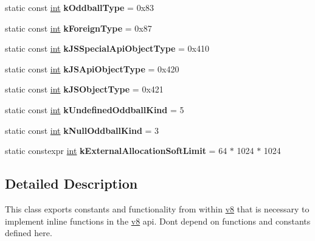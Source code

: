 \begin{DoxyCompactItemize}
static const \mbox{\hyperlink{classint}{int}} {\bfseries k\+Oddball\+Type} = 0x83
\item 
\mbox{\label{classv8_1_1internal_1_1Internals_a263195f36f9e8ee64af70dc267a85d55}} 
static const \mbox{\hyperlink{classint}{int}} {\bfseries k\+Foreign\+Type} = 0x87
\item 
\mbox{\label{classv8_1_1internal_1_1Internals_afa97943a189ab1866404416d2f8779bd}} 
static const \mbox{\hyperlink{classint}{int}} {\bfseries k\+J\+S\+Special\+Api\+Object\+Type} = 0x410
\item 
\mbox{\label{classv8_1_1internal_1_1Internals_aef1693d7df34df433622fdb3e26767c8}} 
static const \mbox{\hyperlink{classint}{int}} {\bfseries k\+J\+S\+Api\+Object\+Type} = 0x420
\item 
\mbox{\label{classv8_1_1internal_1_1Internals_a56b7062df5d9a7df491137d4c3341bcc}} 
static const \mbox{\hyperlink{classint}{int}} {\bfseries k\+J\+S\+Object\+Type} = 0x421
\item 
\mbox{\label{classv8_1_1internal_1_1Internals_a39072b9e0ffea4031f4a1c514208b20d}} 
static const \mbox{\hyperlink{classint}{int}} {\bfseries k\+Undefined\+Oddball\+Kind} = 5
\item 
\mbox{\label{classv8_1_1internal_1_1Internals_a72243c5512cb5cab9d10b6f29e775180}} 
static const \mbox{\hyperlink{classint}{int}} {\bfseries k\+Null\+Oddball\+Kind} = 3
\item 
\mbox{\label{classv8_1_1internal_1_1Internals_af85a33cd47a2c9ed5faa4e1a85a6afce}} 
static constexpr \mbox{\hyperlink{classint}{int}} {\bfseries k\+External\+Allocation\+Soft\+Limit} = 64 $\ast$ 1024 $\ast$ 1024
\end{DoxyCompactItemize}


\subsection{Detailed Description}
This class exports constants and functionality from within \mbox{\hyperlink{namespacev8}{v8}} that is necessary to implement inline functions in the \mbox{\hyperlink{namespacev8}{v8}} api. Don\textquotesingle{}t depend on functions and constants defined here. 


